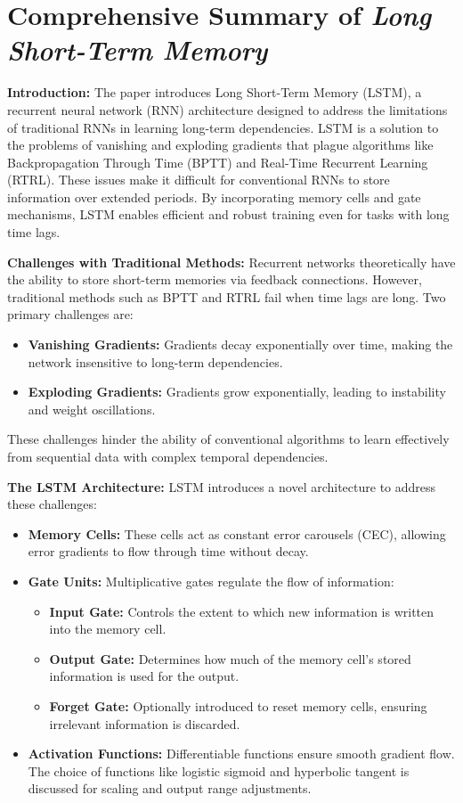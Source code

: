 
\section*{Comprehensive Summary of \textit{Long Short-Term Memory}}

\textbf{Introduction:} The paper introduces Long Short-Term Memory (LSTM), a recurrent neural network (RNN) architecture designed to address the limitations of traditional RNNs in learning long-term dependencies. LSTM is a solution to the problems of vanishing and exploding gradients that plague algorithms like Backpropagation Through Time (BPTT) and Real-Time Recurrent Learning (RTRL). These issues make it difficult for conventional RNNs to store information over extended periods. By incorporating memory cells and gate mechanisms, LSTM enables efficient and robust training even for tasks with long time lags.

\textbf{Challenges with Traditional Methods:} Recurrent networks theoretically have the ability to store short-term memories via feedback connections. However, traditional methods such as BPTT and RTRL fail when time lags are long. Two primary challenges are:
\begin{itemize}
    \item \textbf{Vanishing Gradients:} Gradients decay exponentially over time, making the network insensitive to long-term dependencies.
    \item \textbf{Exploding Gradients:} Gradients grow exponentially, leading to instability and weight oscillations.
\end{itemize}
These challenges hinder the ability of conventional algorithms to learn effectively from sequential data with complex temporal dependencies.

\textbf{The LSTM Architecture:} LSTM introduces a novel architecture to address these challenges:
\begin{itemize}
    \item \textbf{Memory Cells:} These cells act as constant error carousels (CEC), allowing error gradients to flow through time without decay.
    \item \textbf{Gate Units:} Multiplicative gates regulate the flow of information:
    \begin{itemize}
        \item \textbf{Input Gate:} Controls the extent to which new information is written into the memory cell.
        \item \textbf{Output Gate:} Determines how much of the memory cell's stored information is used for the output.
        \item \textbf{Forget Gate:} Optionally introduced to reset memory cells, ensuring irrelevant information is discarded.
    \end{itemize}
    \item \textbf{Activation Functions:} Differentiable functions ensure smooth gradient flow. The choice of functions like logistic sigmoid and hyperbolic tangent is discussed for scaling and output range adjustments.
\end{itemize}

